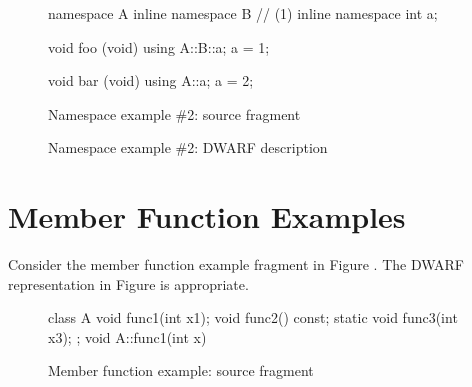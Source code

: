 \begin{figure}[ht]
\begin{nlnlisting}
namespace A {
    inline namespace B {   // (1) inline namespace
        int a;
    }
}

void foo (void)
{
    using A::B::a;
    a = 1;
}

void bar (void)
{
    using A::a;
    a = 2;
}
\end{nlnlisting}
\caption{Namespace example \#2: source fragment}
\label{fig:namespaceexample2sourcefragment}
\end{figure}

\begin{figure}[ht]
\caption{Namespace example \#2: DWARF description}
\label{fig:namespaceexample2dwarfdescription}
\end{figure}

\clearpage
\section{Member Function Examples}
\label{app:memberfunctionexample}
Consider the member function example fragment in 
Figure .
The DWARF representation in 
Figure 
is appropriate.

\begin{figure}[ht]
\begin{nlnlisting}
class A
{
    void func1(int x1);
    void func2() const;
    static void func3(int x3);
};
void A::func1(int x) {}
\end{nlnlisting}
\caption{Member function example: source fragment}
\label{fig:memberfunctionexamplesourcefragment}
\end{figure}

